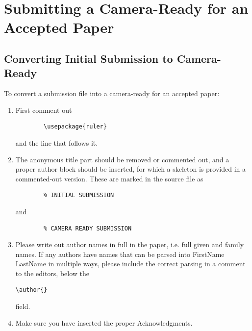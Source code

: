 \documentclass[runningheads]{llncs}
\begin{document}
\section{Submitting a Camera-Ready for an Accepted Paper}
\subsection{Converting Initial Submission to Camera-Ready}
To convert a submission file into a camera-ready for an accepted paper:
\begin{enumerate}
    \item  First comment out \begin{verbatim}
        \usepackage{ruler}
    \end{verbatim} and the line that follows it.
    \item  The anonymous title part should be removed or commented out, and a proper author block should be inserted, for which a skeleton is provided in a commented-out version. These are marked in the source file as \begin{verbatim}
        % INITIAL SUBMISSION 
    \end{verbatim} and \begin{verbatim}
        % CAMERA READY SUBMISSION 
    \end{verbatim}
    \item Please write out author names in full in the paper, i.e. full given and family names. If any authors have names that can be parsed into FirstName LastName in multiple ways, please include the correct parsing in a comment to the editors, below the \begin{verbatim}\author{}\end{verbatim} field.
    \item Make sure you have inserted the proper Acknowledgments.
  \end{enumerate}  
 
\end{document}

